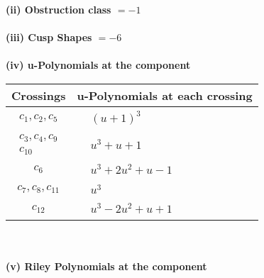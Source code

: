 \documentclass[1p]{elsarticle_modified}
\theoremstyle{definition}
\begin{document}
\flushleft \textbf{(ii) Obstruction class $= -1$}\\~\\
\flushleft \textbf{(iii) Cusp Shapes $= -6$}\\~\\
\newpage\renewcommand{\arraystretch}{1}
\flushleft \textbf{(iv) u-Polynomials at the component}\newline \\
\begin{tabular}{m{50pt}|m{274pt}}
Crossings & \hspace{64pt}u-Polynomials at each crossing \\
\hline $$\begin{aligned}c_{1},c_{2},c_{5}\end{aligned}$$&$\begin{aligned}
&(u+1)^3
\end{aligned}$\\
\hline $$\begin{aligned}c_{3},c_{4},c_{9}\\c_{10}\end{aligned}$$&$\begin{aligned}
&u^3+u+1
\end{aligned}$\\
\hline $$\begin{aligned}c_{6}\end{aligned}$$&$\begin{aligned}
&u^3+2 u^2+u-1
\end{aligned}$\\
\hline $$\begin{aligned}c_{7},c_{8},c_{11}\end{aligned}$$&$\begin{aligned}
&u^3
\end{aligned}$\\
\hline $$\begin{aligned}c_{12}\end{aligned}$$&$\begin{aligned}
&u^3-2 u^2+u+1
\end{aligned}$\\
\hline
\end{tabular}\\~\\
\newpage\renewcommand{\arraystretch}{1}
\flushleft \textbf{(v) Riley Polynomials at the component}\newline \\
\end{document}
